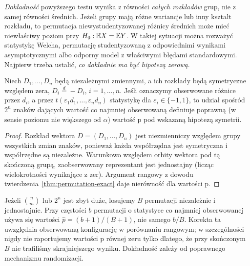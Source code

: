 \begin{uwaga}
\label{rem:perm-exchangeability}
\emph{Dokładność} powyższego testu wynika z równości
\emph{całych rozkładów} grup, nie z samej równości średnich.
Jeżeli grupy mają różne wariancje lub inny kształt rozkładu,
to permutacja niewystudentyzowanej różnicy średnich może
mieć niewłaściwy poziom przy $H_0:\mathbb E X=\mathbb E Y$.
W takiej sytuacji można rozważyć statystykę Welcha,
permutację studentyzowaną z odpowiednimi wynikami
asymptotycznymi albo odporny model z właściwymi
błędami standardowymi. Najpierw trzeba ustalić,
\emph{co dokładnie ma być hipotezą zerową}.
\end{uwaga}

\begin{stwierdzenie}
\label{prop:signflip}
Niech $D_1,\ldots,D_n$ będą niezależnymi zmiennymi,
a ich rozkłady będą symetryczne względem zera,
$D_i\overset d=-D_i$, $i=1,\ldots,n$.
Jeśli oznaczymy obserwowane różnice przez $d_i$,
a przez $t(\varepsilon_1d_1,\ldots,\varepsilon_nd_n)$
statystykę dla $\varepsilon_i\in\{-1,1\}$,
to udział spośród $2^n$ znaków dających wartość
co najmniej obserwowaną definiuje poprawną
(w sensie poziomu nie większego od $\alpha$)
wartość p pod wskazaną hipotezą symetrii.
\end{stwierdzenie}
\begin{proof}
Rozkład wektora $D=(D_1,\ldots,D_n)$ jest niezmienniczy
względem grupy wszystkich zmian znaków, ponieważ
każda współrzędna jest symetryczna i współrzędne są niezależne.
Warunkowo względem orbity wektora pod tą skończoną grupą,
zaobserwowany reprezentant jest jednostajny (licząc
wielokrotności wynikające z zer). Argument rangowy
z dowodu twierdzenia~\ref{thm:permutation-exact}
daje nierówność dla wartości p.
\end{proof}

\begin{uwaga}
Jeżeli $\binom nm$ lub $2^n$ jest zbyt duże,
losujemy $B$ permutacji niezależnie i jednostajnie.
Przy częstości $b$ permutacji o statystyce co najmniej
obserwowanej używa się wartości
$\widehat p=(b+1)/(B+1)$, nie samego $b/B$.
Korekta ta uwzględnia obserwowaną konfigurację
w porównaniu rangowym; w szczególności nigdy nie
raportujemy wartości p równej zeru tylko dlatego,
że przy skończonym $B$ nie trafiliśmy skrajniejszego wyniku.
Dokładność zależy od poprawnego mechanizmu randomizacji.
\end{uwaga}

